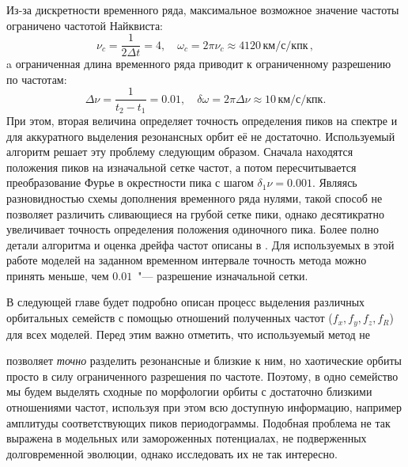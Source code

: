\documentclass{trlnotes}
\begin{document}
Из-за дискретности временного ряда, максимальное возможное значение частоты ограничено частотой Найквиста: 
\[
  ν_c = \frac{1}{2 Δt} = 4, \quad ω_c = 2\pi ν_c \approx 4120\,\text{км}/\text{с}/\text{кпк}\,,
\]
a ограниченная длина временного ряда приводит к ограниченному разрешению по частотам: 
\[
  Δν = \frac{1}{t_2 - t_1} = 0.01, \quad δω = 2\pi Δν \approx 10\,\text{км}/\text{с}/\text{кпк}.
\]
При этом, вторая величина определяет точность определения пиков на спектре и для аккуратного выделения резонансных
орбит её не достаточно. Используемый алгоритм решает эту проблему следующим образом. Сначала находятся положения пиков на изначальной сетке частот, а потом пересчитывается  преобразование Фурье в окрестности пика с шагом $δ_1ν = 0.001$. Являясь
разновидностью схемы дополнения временного ряда нулями, такой способ не позволяет различить сливающиеся на грубой сетке
пики, однако десятикратно увеличивает точность определения положения одиночного пика. Более полно детали алгоритма
и оценка дрейфа частот описаны в \citet{parul2020}. Для  используемых в этой работе моделей на заданном временном
интервале точность метода можно принять меньше, чем $0.01$~"--- разрешение изначальной сетки.

В следующей главе будет подробно описан процесс выделения различных орбитальных семейств с помощью отношений
полученных частот ($f_x, f_y, f_z, f_R$) для всех моделей. Перед этим важно отметить, что используемый метод не

позволяет \emph{точно} разделить резонансные и близкие к ним, но хаотические орбиты просто в силу ограниченного
разрешения по частоте. Поэтому, в одно семейство мы будем выделять сходные по морфологии орбиты с достаточно
близкими отношениями частот, используя при этом всю доступную информацию, например амплитуды соответствующих пиков
периодограммы. Подобная проблема не так выражена в модельных или замороженных потенциалах, не подверженных
долговременной эволюции, однако исследовать их не так
интересно.  
\end{document}
